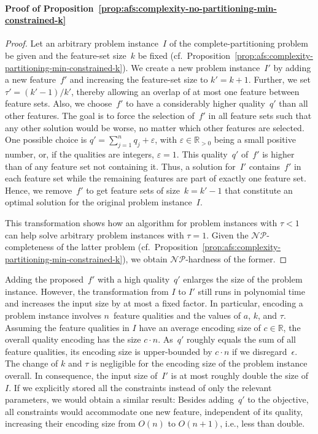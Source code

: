 \documentclass{article}
\theoremstyle{definition}
\begin{document}
\paragraph{Proof of Proposition~\ref{prop:afs:complexity-no-partitioning-min-constrained-k}}
%
\begin{proof}
Let an arbitrary problem instance~$I$ of the complete-partitioning problem be given and the feature-set size~$k$ be fixed (cf.~Proposition~\ref{prop:afs:complexity-partitioning-min-constrained-k}).
We create a new problem instance~$I'$ by adding a new feature~$f'$ and increasing the feature-set size to $k' = k + 1$.
Further, we set $\tau' = (k' - 1) / k'$, thereby allowing an overlap of at most one feature between feature sets.
Also, we choose~$f'$ to have a considerably higher quality~$q'$ than all other features.
The goal is to force the selection of~$f'$ in all feature sets such that any other solution would be worse, no matter which other features are selected.
One possible choice is $q' = \sum_{j=1}^n q_j + \varepsilon$, with $\varepsilon \in \mathbb{R}_{> 0}$ being a small positive number, or, if the qualities are integers, $\varepsilon = 1$.
This quality~$q'$ of~$f'$ is higher than of any feature set not containing it.
Thus, a solution for~$I'$ contains~$f'$ in each feature set while the remaining features are part of exactly one feature set.
Hence, we remove~$f'$ to get feature sets of size~$k = k' - 1$ that constitute an optimal solution for the original problem instance~$I$.
	
This transformation shows how an algorithm for problem instances with $\tau < 1$ can help solve arbitrary problem instances with $\tau = 1$.
Given the $\mathcal{NP}$-completeness of the latter problem (cf.~Proposition~\ref{prop:afs:complexity-partitioning-min-constrained-k}), we obtain $\mathcal{NP}$-hardness of the former.
\end{proof}
%
Adding the proposed~$f'$ with a high quality~$q'$ enlarges the size of the problem instance.
However, the transformation from $I$ to $I'$ still runs in polynomial time and increases the input size by at most a fixed factor.
In particular, encoding a problem instance involves $n$~feature qualities and the values of $a$, $k$, and $\tau$.
Assuming the feature qualities in $I$ have an average encoding size of $c \in \mathbb{R}$, the overall quality encoding has the size $c \cdot n$.
As~$q'$ roughly equals the sum of all feature qualities, its encoding size is upper-bounded by $c \cdot n$ if we disregard~$\epsilon$.
The change of $k$ and $\tau$ is negligible for the encoding size of the problem instance overall.
In consequence, the input size of~$I'$ is at most roughly double the size of~$I$.
If we explicitly stored all the constraints instead of only the relevant parameters, we would obtain a similar result:
Besides adding~$q'$ to the objective, all constraints would accommodate one new feature, independent of its quality, increasing their encoding size from $O(n)$ to $O(n+1)$, i.e., less than double.
\end{document}
